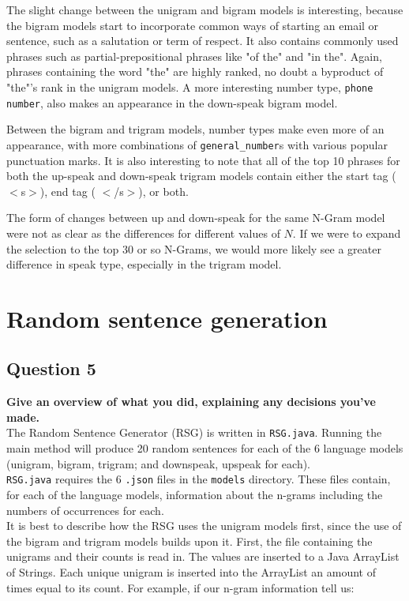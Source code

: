 \documentclass{article} %
\begin{document}
The slight change between the unigram and bigram models is interesting, because the bigram models start to incorporate common ways of starting an email or sentence, such as a salutation or term of respect. It also contains commonly used phrases such as partial-prepositional phrases like "of the" and "in the". Again, phrases containing the word "the" are highly ranked, no doubt a byproduct of "the"'s rank in the unigram models. A more interesting number type, \texttt{phone number}, also makes an appearance in the down-speak bigram model.

Between the bigram and trigram models, number types make even more of an appearance, with more combinations of \texttt{general\_number}s with various popular punctuation marks. It is also interesting to note that all of the top 10 phrases for both the up-speak and down-speak trigram models contain either the start tag ($<$s$>$), end tag ( $<$/s$>$), or both.

The form of changes between up and down-speak for the same N-Gram model were not as clear as the differences for different values of $N$. If we were to expand the selection to the top 30 or so N-Grams, we would more likely see a greater difference in speak type, especially in the trigram model.

\section{Random sentence generation}
\subsection*{Question 5}

\textbf{Give an overview of what you did, explaining any decisions you've made.}
\\

The Random Sentence Generator (RSG) is written in \texttt{RSG.java}. Running the main method will produce 20 random sentences for each of the 6 language models (unigram, bigram, trigram; and downspeak, upspeak for each).\\

\texttt{RSG.java} requires the 6 \texttt{.json} files in the \texttt{models} directory. These files contain, for each of the language models, information about the n-grams including the numbers of occurrences for each.\\

It is best to describe how the RSG uses the unigram models first, since the use of the bigram and trigram models builds upon it. First, the file containing the unigrams and their counts is read in. The values are inserted to a Java ArrayList of Strings. Each unique unigram is inserted into the ArrayList an amount of times equal to its count. For example, if our n-gram information tell us:\\
\end{document}
